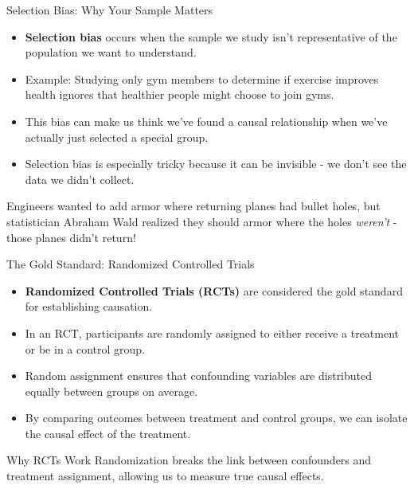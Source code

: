 \documentclass{beamer}
\begin{document}
	\begin{frame}{Selection Bias: Why Your Sample Matters}
		\begin{itemize}
			\item \textbf{Selection bias} occurs when the sample we study isn't representative of the population we want to understand.
			\item Example: Studying only gym members to determine if exercise improves health ignores that healthier people might choose to join gyms.
			\item This bias can make us think we've found a causal relationship when we've actually just selected a special group.
			\item Selection bias is especially tricky because it can be invisible - we don't see the data we didn't collect.
		\end{itemize}
		
		\begin{example}
			Engineers wanted to add armor where returning planes had bullet holes, but statistician Abraham Wald realized they should armor where the holes \textit{weren't} - those planes didn't return!
		\end{example}
	\end{frame}
	
	\begin{frame}{The Gold Standard: Randomized Controlled Trials}
		\begin{itemize}
			\item \textbf{Randomized Controlled Trials (RCTs)} are considered the gold standard for establishing causation.
			\item In an RCT, participants are randomly assigned to either receive a treatment or be in a control group.
			\item Random assignment ensures that confounding variables are distributed equally between groups on average.
			\item By comparing outcomes between treatment and control groups, we can isolate the causal effect of the treatment.
		\end{itemize}
		
		\begin{block}{Why RCTs Work}
			Randomization breaks the link between confounders and treatment assignment, allowing us to measure true causal effects.
		\end{block}
	\end{frame}
	
\end{document}
